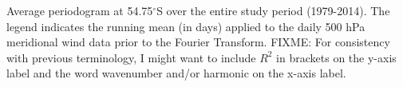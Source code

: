 \label{fig:fourier_spectrum}
Average periodogram at 54.75$^{\circ}$S over the entire study period (1979-2014). The legend indicates the running mean (in days) applied to the daily 500 hPa meridional wind data prior to the Fourier Transform. 
FIXME: For consistency with previous terminology, I might want to include $R^2$ in brackets on the y-axis label and the word wavenumber and/or harmonic on the x-axis label.